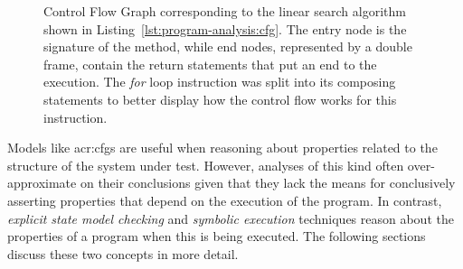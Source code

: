 \begin{figure}[t]
\centering
{}
\caption[Control Flow Graph of the Linear Search Algorithm]{Control Flow Graph corresponding to the linear search algorithm shown in Listing~\ref{lst:program-analysis:cfg}. The entry node is the signature of the method, while end nodes, represented by a double frame, contain the return statements that put an end to the execution. The \textit{for} loop instruction was split into its composing statements to better display how the control flow works for this instruction.}
\label{fig:program-analysis:cfg}
\end{figure}

Models like \acrshort{acr:cfg}s are useful when reasoning about properties related to the structure of the system under test. However, analyses of this kind often over-approximate on their conclusions given that they lack the means for conclusively asserting properties that depend on the execution of the program. In contrast, \textit{explicit state model checking} and \textit{symbolic execution} techniques reason about the properties of a program when this is being executed. The following sections discuss these two concepts in more detail.


